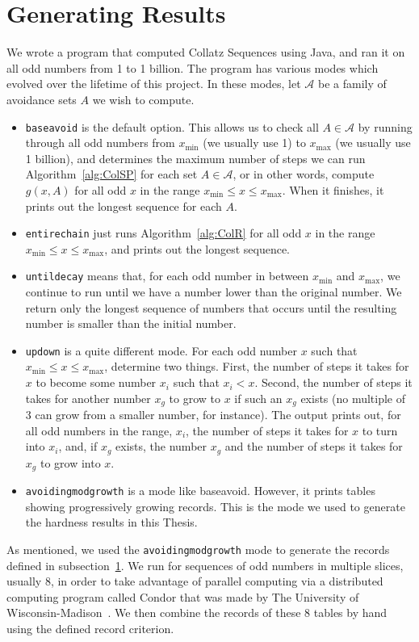 \section{Generating Results} \label{subsec:algcomp}
We wrote a program that computed Collatz Sequences using Java, and ran it on all odd numbers from 1 to 1 billion. The program has various modes which evolved over the lifetime of this project. In these modes, let $\mathcal{A}$ be a family of avoidance sets $A$ we wish to compute.
\begin{itemize}
    \item {\tt baseavoid} is the default option. This allows us to check all $A \in \mathcal{A}$ by running through all odd numbers from $x_{\min}$ (we usually use 1) to $x_{\max}$ (we usually use 1 billion), and determines the maximum number of steps we can run Algorithm~\ref{alg:ColSP} for each set $A \in \mathcal{A}$, or in other words, compute $g(x,A)$ for all odd $x$ in the range $x_{\min} \leq x \leq x_{\max}$. When it finishes, it prints out the longest sequence for each $A$.
    \item {\tt entirechain} just runs Algorithm~\ref{alg:ColR} for all odd $x$ in the range $x_{\min} \leq x \leq x_{\max}$, and prints out the longest sequence.
    \item {\tt untildecay} means that, for each odd number in between $x_{\min}$ and $x_{\max}$, we continue to run until we have a number lower than the original number. We return only the longest sequence of numbers that occurs until the resulting number is smaller than the initial number.
    \item {\tt updown} is a quite different mode. For each odd number $x$ such that $x_{\min}\leq x \leq x_{\max}$, determine two things. First, the number of steps it takes for $x$ to become some number $x_i$ such that $x_i < x$. Second, the number of steps it takes for another number $x_g$ to grow to $x$ if such an $x_g$ exists (no multiple of 3 can grow from a smaller number, for instance). The output prints out, for all odd numbers in the range, $x_i$, the number of steps it takes for $x$ to turn into $x_i$, and, if $x_g$ exists, the number $x_g$ and the number of steps it takes for $x_g$ to grow into $x$.
    \item {\tt avoidingmodgrowth} is a mode like baseavoid. However, it prints tables showing progressively growing records. This is the mode we used to generate the hardness results in this Thesis.
\end{itemize}
As mentioned, we used the {\tt avoidingmodgrowth} mode to generate the records defined in subsection~\ref{subsec:algcomp}. We run for sequences of odd numbers in multiple slices, usually 8, in order to take advantage of parallel computing via a distributed computing program called Condor that was made by The University of Wisconsin-Madison~\cite{Thain:2005:DCP:1064323.1064336}. We then combine the records of these 8 tables by hand using the defined record criterion. \par
